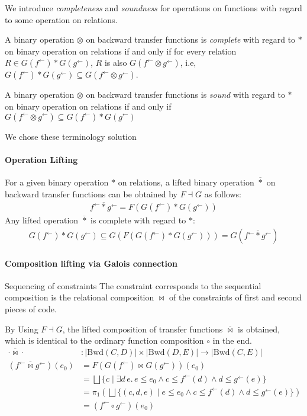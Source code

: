 \documentclass{llncs}
\newcommand{\Unidir}{\mathrm{Bwd}}
\newcommand{\fb}{{f^{\leftarrow}}}
\newcommand{\gb}{{g^{\leftarrow}}}
\newcommand{\bigjoin}{\bigsqcup}
\newcommand{\comp}{\circ}
\newcommand{\starlift}{\mathbin{\overline{*}}}
\newcommand{\bowtielift}{\mathbin{\overline{\bowtie}}}
\begin{document}
  We introduce \emph{completeness} and \emph{soundness} for operations on functions with regard to some operation on relations.
  \begin{definition}[Completeness]
   A binary operation $\otimes$ on backward transfer functions is \emph{complete} with regard to $*$ on binary operation on relations if and only if for every relation $R \in G(\fb) * G(\gb)$, $R$ is also $G (\fb \otimes \gb)$, i.e, $G(\fb) * G(\gb) \subseteq G (\fb \otimes \gb)$.
  \end{definition}

  \begin{definition}[Soundness]
  A binary operation $\otimes$ on backward transfer functions is \emph{sound} with regard to $*$ on binary operation on relations if and only if
  $G (\fb \otimes \gb) \subseteq G(\fb) * G(\gb)$
  \end{definition}

  We chose these terminology solution
  \paragraph{Operation Lifting}
  For a given binary operation $*$ on relations, a lifted binary operation $\starlift$ on backward transfer functions can be obtained by $F \dashv G$ as follows:
  \begin{align*}
  \fb \starlift \gb = F (G(\fb) * G(\gb))
  \end{align*}
  Any lifted operation $\starlift$ is complete with regard to $*$:
  \begin{align*}
  G(\fb) * G(\gb) \subseteq G(F(G(\fb) * G(\gb))) = G(\fb \starlift \gb)
  \end{align*}


\paragraph{Composition lifting via Galois connection}


  Sequencing of constraints
    The constraint corresponds to the sequential composition is the relational composition $\bowtie$ of the constraints of first and second pieces of code.

    By Using $F \dashv G$, the lifted composition of transfer functions $\bowtielift$ is obtained, which is identical to the ordinary function composition $\comp$ in the end.
    \begin{align*}
      \cdot \bowtielift \cdot &: \left| \Unidir(C, D) \right| \times  \left| \Unidir(D, E) \right| \to  \left| \Unidir(C, E) \right| \\
      (\fb \bowtielift \gb) (e_{0}) &= F(G(\fb) \bowtie G(\gb)) (e_{0}) \\
                                  &= \bigjoin \{ c \mid \exists d\, e.\,e \leq e_{0} \land c \leq \fb(d) \land d \leq \gb(e) \} \\
                                  &= \pi_{1} (\bigjoin \{ (c, d , e) \mid e \leq e_{0} \land c \leq \fb(d) \land d \leq \gb(e) \}) \\
                                  &= (\fb \comp \gb)(e_{0})
    \end{align*}
\end{document}
